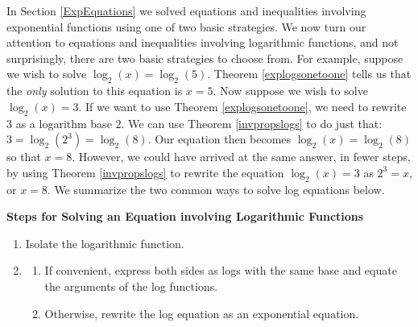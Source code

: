 

\setcounter{footnote}{0}

\label{LogEquations}

In Section \ref{ExpEquations} we solved equations and inequalities involving exponential functions using one of two basic strategies.  We now turn our attention to equations and inequalities involving logarithmic functions, and not surprisingly, there are two basic strategies to choose from.  For example, suppose we wish  to solve $\log_{2}(x) = \log_{2}(5)$.  Theorem \ref{explogsonetoone} tells us that the \textit{only} solution to this equation is $x=5$.  Now suppose we wish to solve $\log_{2}(x) = 3$.  If we want to use Theorem \ref{explogsonetoone}, we need to rewrite $3$ as a logarithm base $2$.   We can use Theorem \ref{invpropslogs} to do just that: $3 = \log_{2}\left(2^{3}\right) = \log_{2}(8)$.  Our equation then becomes  $\log_{2}(x) =  \log_{2}(8)$ so that $x = 8$.  However, we could have arrived at the same answer,  in fewer steps, by using Theorem \ref{invpropslogs} to rewrite the equation $\log_{2}(x) = 3$ as $2^{3} = x$, or $x=8$.  We summarize the two common ways to solve log equations below.

\smallskip

\colorbox{ResultColor}{\bbm

\centerline{\textbf{Steps for Solving an Equation involving Logarithmic Functions}}  

\begin{enumerate}

\item  Isolate the logarithmic function.

\item  \begin{enumerate}

\item  If convenient, express both sides as logs with the same base and equate the arguments of the log functions.

\item  Otherwise, rewrite the log equation as an exponential equation.


\end{enumerate}

\end{enumerate}

\ebm}

\smallskip


